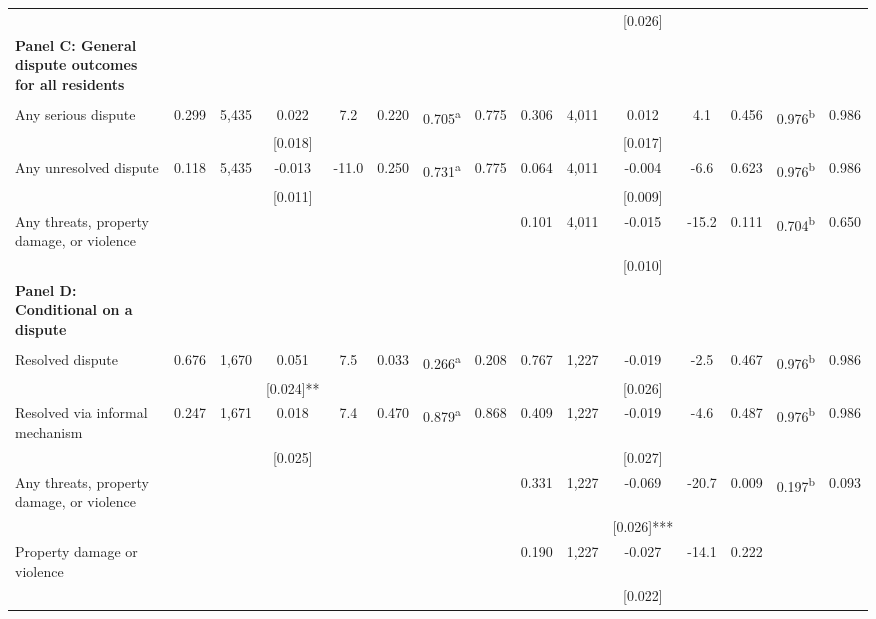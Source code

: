 \begin{tabular}{lcccccccccccccc}
 &  &  &  &  &  &  &  &  &  & [0.026] &  &  &  & \\
\textbf{Panel C: General dispute outcomes for all residents} &  &  &  &  &  &  &  &  &  &  &  &  &  & \\
 &  &  &  &  &  &  &  &  &  &  &  &  &  & \\
Any serious dispute & 0.299 & 5,435 & 0.022 & 7.2 & 0.220 & 0.705\textsuperscript{a} & 0.775 & 0.306 & 4,011 & 0.012 & 4.1 & 0.456 & 0.976\textsuperscript{b} & 0.986\\
 &  &  & [0.018] &  &  &  &  &  &  & [0.017] &  &  &  & \\
Any unresolved dispute & 0.118 & 5,435 & -0.013 & -11.0 & 0.250 & 0.731\textsuperscript{a} & 0.775 & 0.064 & 4,011 & -0.004 & -6.6 & 0.623 & 0.976\textsuperscript{b} & 0.986\\
 &  &  & [0.011] &  &  &  &  &  &  & [0.009] &  &  &  & \\
\phantom{} Any threats, property damage, or violence &  &  &  &  &  &  &  & 0.101 & 4,011 & -0.015 & -15.2 & 0.111 & 0.704\textsuperscript{b} & 0.650\\
 &  &  &  &  &  &  &  &  &  & [0.010] &  &  &  & \\
\textbf{Panel D: Conditional on a dispute} &  &  &  &  &  &  &  &  &  &  &  &  &  & \\
 &  &  &  &  &  &  &  &  &  &  &  &  &  & \\
Resolved dispute & 0.676 & 1,670 & 0.051 & 7.5 & 0.033 & 0.266\textsuperscript{a} & 0.208 & 0.767 & 1,227 & -0.019 & -2.5 & 0.467 & 0.976\textsuperscript{b} & 0.986\\
 &  &  & [0.024]** &  &  &  &  &  &  & [0.026] &  &  &  & \\
\quad Resolved via informal mechanism & 0.247 & 1,671 & 0.018 & 7.4 & 0.470 & 0.879\textsuperscript{a} & 0.868 & 0.409 & 1,227 & -0.019 & -4.6 & 0.487 & 0.976\textsuperscript{b} & 0.986\\
 &  &  & [0.025] &  &  &  &  &  &  & [0.027] &  &  &  & \\
\phantom{} Any threats, property damage, or violence \phantom{} &  &  &  &  &  &  &  & 0.331 & 1,227 & -0.069 & -20.7 & 0.009 & 0.197\textsuperscript{b} & 0.093\\
 &  &  &  &  &  &  &  &  &  & [0.026]*** &  &  &  & \\
\quad Property damage or violence \phantom{} &  &  &  &  &  &  &  & 0.190 & 1,227 & -0.027 & -14.1 & 0.222 &  & \\
 &  &  &  &  &  &  &  &  &  & [0.022] &  &  &  & \\

\end{tabular}
